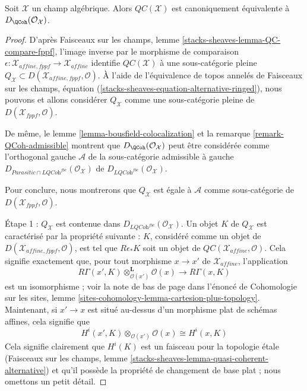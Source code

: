 \begin{proposition}
\label{proposition-QC-compare}
Soit $\mathcal{X}$ un champ algébrique. Alors $\mathit{QC}(\mathcal{X})$ est
canoniquement équivalente à $D_\QCoh(\mathcal{O}_\mathcal{X})$.
\end{proposition}

\begin{proof}
D'après Faisceaux sur les champs, lemme
\ref{stacks-sheaves-lemma-QC-compare-fppf}, l'image inverse par le morphisme de
comparaison
$\epsilon : \mathcal{X}_{affine, fppf} \to \mathcal{X}_{affine}$
identifie $\mathit{QC}(\mathcal{X})$ à une sous-catégorie pleine
$Q_\mathcal{X} \subset D(\mathcal{X}_{affine, fppf}, \mathcal{O})$. À l'aide
de l'équivalence de topos annelés de Faisceaux sur les champs, équation
(\ref{stacks-sheaves-equation-alternative-ringed}), nous pouvons et allons
considérer $Q_\mathcal{X}$ comme une sous-catégorie pleine de
$D(\mathcal{X}_{fppf}, \mathcal{O})$.

\medskip\noindent
De même, le lemme \ref{lemma-bousfield-colocalization} et la remarque
\ref{remark-QCoh-admissible} montrent que
$D_\QCoh(\mathcal{O}_\mathcal{X})$ peut être considérée comme l'orthogonal
gauche $\mathcal{A}$ de la sous-catégorie admissible à gauche
$D_{\textit{Parasitic} \cap \textit{LQCoh}^{fbc}}(\mathcal{O}_\mathcal{X})$
de $D_{\textit{LQCoh}^{fbc}}(\mathcal{O}_\mathcal{X})$.

\medskip\noindent
Pour conclure, nous montrerons que $Q_\mathcal{X}$ est égale à $\mathcal{A}$
comme sous-catégorie de $D(\mathcal{X}_{fppf}, \mathcal{O})$.

\medskip\noindent
Étape 1 : $Q_\mathcal{X}$ est contenue dans
$D_{\textit{LQCoh}^{fbc}}(\mathcal{O}_\mathcal{X})$.
Un objet $K$ de $Q_\mathcal{X}$ est caractérisé par la propriété suivante :
$K$, considéré comme un objet de
$D(\mathcal{X}_{affine, fppf}, \mathcal{O})$, est tel que $R\epsilon_*K$ soit un
objet de $\mathit{QC}(\mathcal{X}_{affine}, \mathcal{O})$. Cela signifie
exactement que, pour tout morphisme $x \to x'$ de
$\mathcal{X}_{affine}$, l'application
$$
R\Gamma(x', K) \otimes_{\mathcal{O}(x')}^\mathbf{L} \mathcal{O}(x)
\longrightarrow
R\Gamma(x, K)
$$
est un isomorphisme ; voir la note de bas de page dans l'énoncé de Cohomologie
sur les sites, lemme
\ref{sites-cohomology-lemma-cartesion-plus-topology}. Maintenant, si
$x' \to x$ est situé au-dessus d'un morphisme plat de schémas affines, cela
signifie que
$$
H^i(x', K) \otimes_{\mathcal{O}(x')} \mathcal{O}(x)
\cong
H^i(x, K)
$$
Cela signifie clairement que $H^i(K)$ est un faisceau pour la topologie étale
(Faisceaux sur les champs, lemme
\ref{stacks-sheaves-lemma-quasi-coherent-alternative}) et qu'il possède la
propriété de changement de base plat ; nous omettons un petit détail.


\end{proof}
